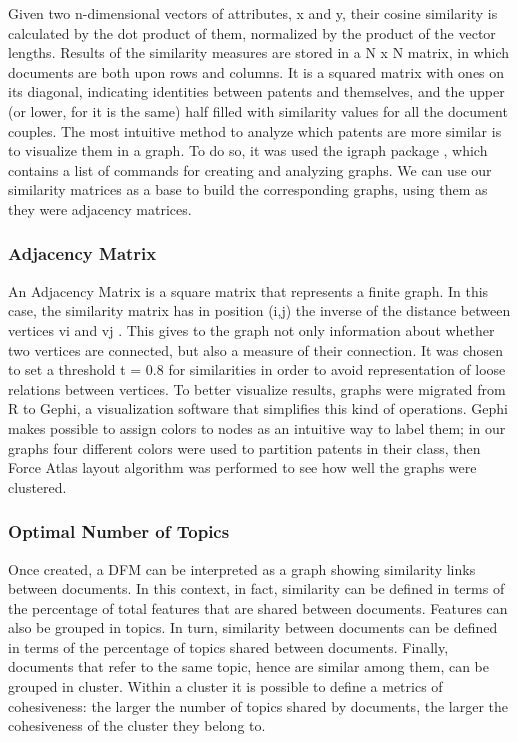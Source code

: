 \documentclass[]{book}
\theoremstyle{definition}
\theoremstyle{definition}
\theoremstyle{definition}
\theoremstyle{remark}
\begin{document}
Given two n-dimensional vectors of attributes, x and y, their cosine
similarity is calculated by the dot product of them, normalized by the
product of the vector lengths. Results of the similarity measures are
stored in a N x N matrix, in which documents are both upon rows and
columns. It is a squared matrix with ones on its diagonal, indicating
identities between patents and themselves, and the upper (or lower, for
it is the same) half filled with similarity values for all the document
couples. The most intuitive method to analyze which patents are more
similar is to visualize them in a graph. To do so, it was used the
igraph package , which contains a list of commands for creating and
analyzing graphs. We can use our similarity matrices as a base to build
the corresponding graphs, using them as they were adjacency matrices.

\subsubsection*{Adjacency Matrix}\label{adjacency-matrix}

An Adjacency Matrix is a square matrix that represents a finite graph.
In this case, the similarity matrix has in position (i,j) the inverse of
the distance between vertices vi and vj . This gives to the graph not
only information about whether two vertices are connected, but also a
measure of their connection. It was chosen to set a threshold t = 0.8
for similarities in order to avoid representation of loose relations
between vertices. To better visualize results, graphs were migrated from
R to Gephi, a visualization software that simplifies this kind of
operations. Gephi makes possible to assign colors to nodes as an
intuitive way to label them; in our graphs four different colors were
used to partition patents in their class, then Force Atlas layout
algorithm was performed to see how well the graphs were clustered.

\subsubsection*{Optimal Number of
Topics}\label{optimal-number-of-topics}

Once created, a DFM can be interpreted as a graph showing similarity
links between documents. In this context, in fact, similarity can be
defined in terms of the percentage of total features that are shared
between documents. Features can also be grouped in topics. In turn,
similarity between documents can be defined in terms of the percentage
of topics shared between documents. Finally, documents that refer to the
same topic, hence are similar among them, can be grouped in cluster.
Within a cluster it is possible to define a metrics of cohesiveness: the
larger the number of topics shared by documents, the larger the
cohesiveness of the cluster they belong to.
\end{document}
